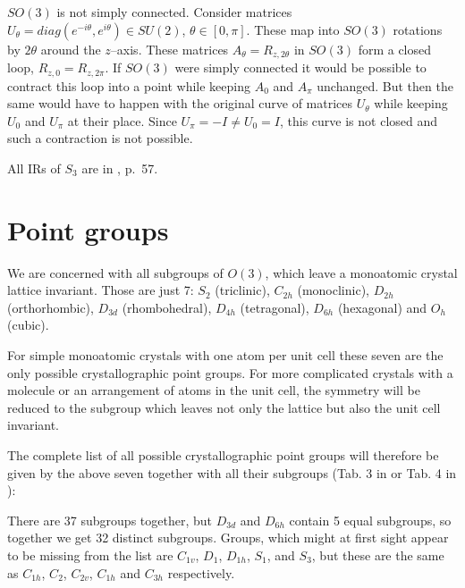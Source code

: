 $SO(3)$ is not simply connected. Consider matrices
$U_{\theta}=diag(e^{-i\theta}, e^{i\theta})\in SU(2)$, $\theta\in[0,\pi]$.
These map into $SO(3)$ rotations by $2\theta$ around the $z$--axis. These
matrices $A_\theta=R_{z,2\theta}$ in $SO(3)$ form a closed loop,
$R_{z,0}=R_{z,2\pi}$. If $SO(3)$ were simply connected it would be possible to
contract this loop into a point while keeping $A_0$ and $A_\pi$ unchanged. But
then the same would have to happen with the original curve of matrices
$U_\theta$ while keeping $U_0$ and $U_\pi$ at their place. Since
$U_{\pi}=-I\not= U_0=I$, this curve is not closed and such a contraction is
not possible.

All IRs of $S_3$ are in \cite{sternberg}, p.~57.






\section{Point groups}

We are concerned with all subgroups of $O(3)$, which leave a monoatomic
crystal lattice invariant. Those are just 7: $S_2$ (triclinic), $C_{2h}$
(monoclinic), $D_{2h}$ (orthorhombic), $D_{3d}$ (rhombohedral), $D_{4h}$
(tetragonal), $D_{6h}$ (hexagonal) and $O_{h}$ (cubic).

For simple monoatomic crystals with one atom per unit cell these seven are the
only possible crystallographic point groups. For more complicated crystals
with a molecule or an arrangement of atoms in the unit cell, the symmetry will
be reduced to the subgroup which leaves not only the lattice but also the unit
cell invariant.

The complete list of all possible crystallographic point groups will therefore
be given by the above seven together with all their subgroups
(Tab. 3 in \cite{birss} or Tab. 4 in \cite{sternberg}):

There are 37 subgroups together, but $D_{3d}$ and $D_{6h}$ contain 5 equal
subgroups, so together we get 32 distinct subgroups. Groups, which might at
first sight appear to be missing from the list are $C_{1v}$, $D_1$, $D_{1h}$,
$S_1$, and $S_3$, but these are the same as $C_{1h}$, $C_2$, $C_{2v}$, $C_{1h}$
and $C_{3h}$ respectively.

